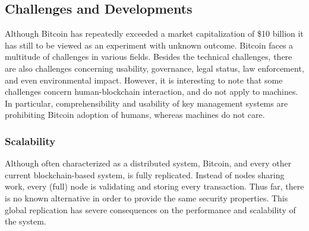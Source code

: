 


\subsection{Challenges and Developments}
\label{sec:btc_challenges}

Although Bitcoin has repeatedly exceeded a market capitalization of \$10 billion it has still to be viewed as an experiment with unknown outcome. Bitcoin faces a multitude of challenges in various fields. Besides the technical challenges, there are also challenges concerning usability, governance, legal status, law enforcement, and even environmental impact. However, it is interesting to note that some challenges concern human-blockchain interaction, and do not apply to machines. In particular, comprehensibility and usability of key management systems are prohibiting Bitcoin adoption of humans, whereas machines do not care.

\subsubsection{Scalability}
\label{sec:btc_scalability}

Although often characterized as a distributed system, Bitcoin, and every other current blockchain-based system, is fully replicated. Instead of nodes sharing work, every (full) node is validating and storing every transaction. Thus far, there is no known alternative in order to provide the same security properties. This global replication has severe consequences on the performance and scalability of the system.

